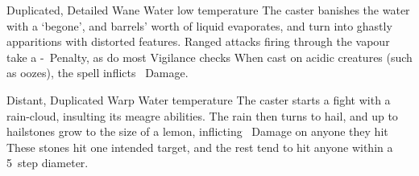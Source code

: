 \ifodd\value{diceNo}

  {Duplicated, Detailed}%
  {Wane}%
  {Water}%
  {low temperature}%
  {The caster banishes the water with a `begone', and  barrels' worth of liquid evaporates, and turn into ghastly apparitions with distorted features.
  Ranged attacks firing through the vapour take a -~Penalty, as do most Vigilance checks}%
  {
  When cast on acidic creatures (such as oozes), the spell inflicts \showDam\ Damage.}

\else

  {Distant, Duplicated}%
  {Warp}%
  {Water}%
  {temperature}%
  {The caster starts a fight with a rain-cloud, insulting its meagre abilities.
  The rain then turns to hail, and up to  hailstones grow to the size of a lemon, inflicting \showDam~Damage on anyone they hit}%
  {These stones hit one intended target, and the rest tend to hit anyone within a 5~\gls{step} diameter.}

\fi
{}
